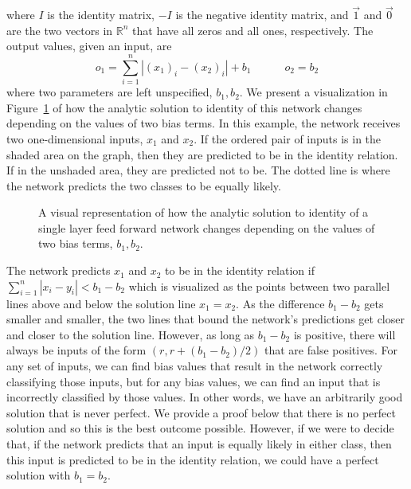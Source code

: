\documentclass{article}
\begin{document}
%
where $I$ is the identity matrix, $-I$ is the negative identity matrix, and $\vec{1}$ and $\vec{0}$ are the two vectors in $\mathbb{R}^n$ that have all zeros and all ones, respectively. The output values, given an input, are
%
\[ o_1 = \sum_{i = 1}^{n}|(x_1)_i- (x_2)_i|+ b_1 \qquad \quad  o_2 = b_2\]
%
where two parameters are left unspecified, $b_1, b_2$. We present a visualization in Figure~\ref{fig:analyticff} of how the analytic solution to identity of this network changes depending on the values of two bias terms. In this example, the network receives two one-dimensional inputs, $x_1$ and $x_2$. If the ordered pair of inputs is in the shaded area on the graph, then they are predicted to be in the identity relation. If in the unshaded area, they are predicted not to be. The dotted line is where the network predicts the two classes to be equally likely.


\begin{figure}[h]
  \centering
  \newcommand\X{2}
  \newcommand\E{0.03}
  \caption{A visual representation of how the analytic solution to identity of a single layer feed forward network changes depending on the values of two bias terms, $b_1,b_2$.}
  \label{fig:analyticff}
\end{figure}

The network predicts $x_1$ and $x_2$ to be in the identity relation if $\sum_{i = 1}^{n}|x_i- y_i| < b_1-b_2$ which is visualized as the points between two parallel lines above and below the solution line $x_1 = x_2$. As the difference $b_1-b_2$ gets smaller and smaller, the two lines that bound the network's predictions get closer and closer to the solution line. However, as long as $b_1-b_2$ is positive, there will always be inputs of the form $(r,r+(b_1-b_2)/2)$ that are false positives. For any set of inputs, we can find bias values that result in the network correctly classifying those inputs, but for any bias values, we can find an input that is incorrectly classified by those values. In other words, we have an arbitrarily good solution that is never perfect. We provide a proof below that there is no perfect solution and so this is the best outcome possible. However, if we were to decide that, if the network predicts that an input is equally likely in either class, then this input is predicted to be in the identity relation, we could have a perfect solution with $b_1= b_2$.
\end{document}
